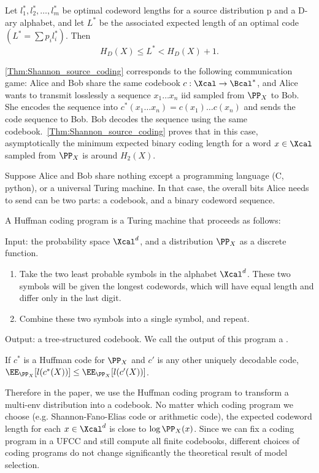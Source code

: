 \begin{theorem}\cite[Thm. 5.4.1]{cover1999elements}\label{Thm:Shannon_source_coding}
    Let $l_1^*,l_2^*,\ldots,l_m^*$ be optimal codeword lengths for a source distribution p and a D-ary alphabet, and let $L^*$ be the associated expected length of an optimal code $( L^* = \sum p_il_i^* )$. Then 
    $$H_D(X)\leq L^*<H_D(X)+1.$$
\end{theorem}
\cref{Thm:Shannon_source_coding} corresponds to the following communication game: Alice and Bob share the same codebook $c:\Xcal\to \Bcal^*$, and Alice wants to transmit losslessly a sequence $x_1\dots x_n$ iid sampled from $\PP_X$ to Bob. She encodes the sequence into $c^*(x_1\dots x_n)=c(x_1)\dots c(x_n)$ and sends the code sequence to Bob. Bob decodes the sequence using the same codebook.~\cref{Thm:Shannon_source_coding} proves that in this case, asymptotically the minimum expected binary coding length for a word $x\in\Xcal$ sampled from $\PP_X$ is around $H_2(X)$.

Suppose Alice and Bob share nothing except a programming language (C, python), or a universal Turing machine. In that case, the overall bits Alice needs to send can be two parts: a codebook, and a binary codeword sequence. 

\begin{definition}\label{def:Huffman_code}
    A Huffman coding program is a Turing machine that proceeds as follows:
    
    Input: the probability space $\Xcal^d$, and a distribution $\PP_X$ as a discrete function.
    \begin{enumerate}
        \item Take the two least probable symbols in the alphabet $\Xcal^d$. These two symbols will be given the longest codewords, which will have equal length and differ only in the last digit.
        \item Combine these two symbols into a single symbol, and repeat.
    \end{enumerate}
    Output: a tree-structured codebook.
    We call the output of this program a .
\end{definition}
\begin{theorem}\label{thm:huffman_optimal}
    If $c^*$ is a Huffman code for $\PP_X$ and $c'$ is any other uniquely decodable code, $\EE_{\PP_X}[l(c^*(X))] \leq \EE_{\PP_X}[l(c'(X))] $.
\end{theorem}
Therefore in the paper, we use the Huffman coding program to transform a multi-env distribution into a codebook. No matter which coding program we choose (e.g. Shannon-Fano-Elias code or arithmetic code), the expected codeword length for each $x\in\Xcal^d$ is close to $\log\PP_X(x)$. Since we can fix a coding program in a UFCC and still compute all finite codebooks, different choices of coding programs do not change significantly the theoretical result of model selection.